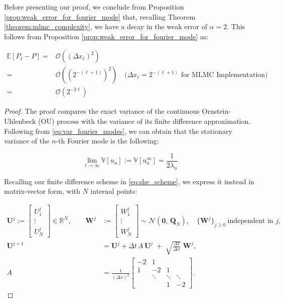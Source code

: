 Before presenting our proof, we conclude from Proposition 
\ref{prop:weak_error_for_fourier_mode}
that, recalling Theorem \ref{theorem:mlmc_complexity}, 
we have a decay in the weak error of $\alpha = 2$. This follows from Proposition 
\ref{prop:weak_error_for_fourier_mode} as:

\begin{align*}
    \mathbb{E}[P_\ell - P] =& \mathcal{O}\left((\Delta x_\ell)^2\right)\\
                           =& \mathcal{O}\left((2^{-(\ell + 1)})^2\right) 
                           \quad (\Delta x_\ell = 2^{-(\ell+1)} \text{ for MLMC Implementation)}\\
                           =& \mathcal{O}\left( 2^{-2\ell}\right)
\end{align*}


\begin{proof}
The proof compares the exact variance of the
continuous Ornstein-Uhlenbeck 
(OU) process
with the variance of its finite difference approximation. 
Following from \eqref{eq:var_fourier_modes}, we can obtain that the 
stationary variance of the $n$-th Fourier mode is the following:

\begin{equation}\label{eq:stationary_variance}
    \lim_{t \to \infty} \mathbb{V}[u_n]
    := \mathbb{V}[u_n^{\infty}] = \frac{1}{2\lambda_n}
\end{equation}

Recalling our finite difference scheme in \eqref{eq:she_scheme},
we express it instead in matrix-vector form, with $N$ 
internal points:

\begin{align}
  \mathbf{U}^j :=
  \begin{bmatrix}
    U_1^j \\ \vdots \\ U_N^j
  \end{bmatrix}\in\mathbb{R}^N,\qquad
  \mathbf{W}^j &:=
  \begin{bmatrix}
    W_1^j \\ \vdots \\ W_N^j
  \end{bmatrix}
  \sim \mathcal{N}(\mathbf{0},\,\mathbf{Q}_N), \quad
  \{\mathbf{W}^j\}_{j\ge 0}\ \text{independent in $j$},\\[2mm]
  \mathbf{U}^{j+1} &= \mathbf{U}^j + \Delta t\,A\,\mathbf{U}^j
  \;+\; \sqrt{\frac{\Delta t}{\Delta x}}\;\mathbf{W}^j,
  \label{eq:scheme_matrix_vector}\\
  A &= \frac{1}{(\Delta x)^2}
  \begin{bmatrix}
    -2 & 1  &        &        \\
     1 & -2 & 1      &        \\
       & \ddots & \ddots & \ddots \\
       &        & 1      & -2
  \end{bmatrix}.
\end{align}



\end{proof}
